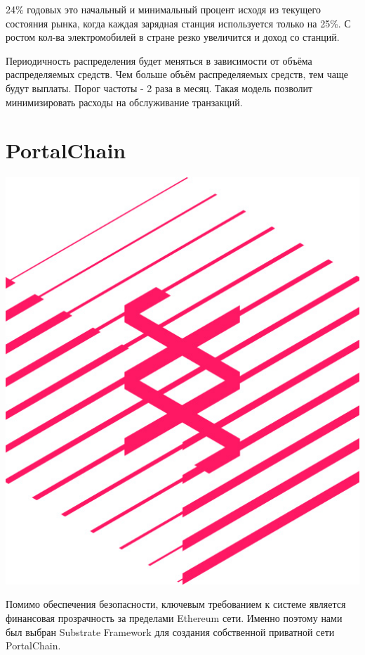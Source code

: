 \documentclass[a4paper,12pt]{report}
\begin{document}
24\% годовых это начальный и минимальный процент исходя из текущего состояния рынка, когда каждая зарядная станция используется только на 25\%. С ростом кол-ва электромобилей в стране резко увеличится и доход со станций.  

Периодичность распределения будет меняться в зависимости от объёма распределяемых средств. Чем больше объём распределяемых средств, тем чаще будут выплаты. Порог частоты - 2 раза в месяц. Такая модель позволит минимизировать расходы на обслуживание транзакций.


\section{PortalChain}

\vspace*{0.5cm}
\includegraphics[width=13.6cm]{substrate-logo}
\vspace*{0.5cm}


Помимо обеспечения безопасности, ключевым требованием к системе является финансовая прозрачность за пределами Ethereum сети.
Именно поэтому нами был выбран Substrate Framework для создания собственной приватной сети PortalChain.
\end{document}
